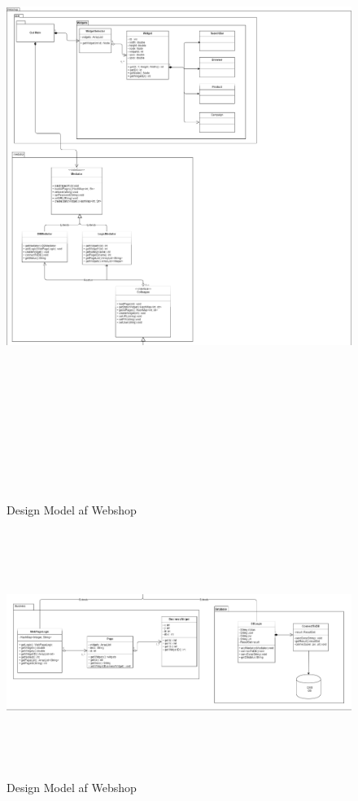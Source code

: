 \begin{figure}[H]
  \includegraphics[width=\linewidth ,height=21cm]{elaborationsdokumentet/figurer/analyse/UMLdel2.png}
  \caption{Design Model af Webshop}
  \label{fig:Design Model af Webshop del 1}
\end{figure}

\begin{figure}[H]
  \includegraphics[width=\linewidth ,height=8cm]{elaborationsdokumentet/figurer/analyse/UMLdel1.png}
  \caption{Design Model af Webshop}
  \label{fig:Design Model af Webshop del 2}
\end{figure}

